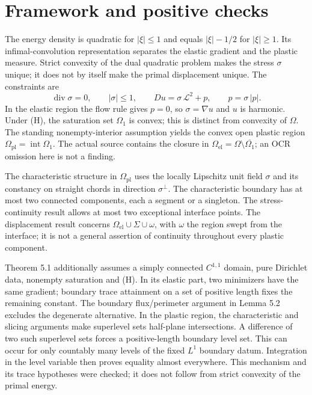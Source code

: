 \documentclass[10pt]{article}
\begin{document}
\section*{Framework and positive checks}
The energy density is quadratic for \(|\xi|\leq1\) and equals \(|\xi|-1/2\) for \(|\xi|\geq1\). Its infimal-convolution representation separates the elastic gradient and the plastic measure. Strict convexity of the dual quadratic problem makes the stress \(\sigma\) unique; it does not by itself make the primal displacement unique. The constraints are \[\operatorname{div}\sigma=0,\qquad |\sigma|\leq1,\qquad
 Du=\sigma\,\mathcal L^2+p,\qquad p=\sigma\,|p|.\] In the elastic region the flow rule gives \(p=0\), so \(\sigma=\nabla u\) and \(u\) is harmonic. Under (H), the saturation set \(\Omega_1\) is convex; this is distinct from convexity of \(\Omega\). The standing nonempty-interior assumption yields the convex open plastic region \(\Omega_{\mathrm{pl}}=\operatorname{int}\Omega_1\). The actual source contains the closure in \(\Omega_{\mathrm{el}}=\Omega\setminus\overline{\Omega_1}\); an OCR omission here is not a finding.\par
The characteristic structure in \(\Omega_{\mathrm{pl}}\) uses the locally Lipschitz unit field \(\sigma\) and its constancy on straight chords in direction \(\sigma^\perp\). The characteristic boundary has at most two connected components, each a segment or a singleton. The stress-continuity result allows at most two exceptional interface points. The displacement result concerns \(\Omega_{\mathrm{el}}\cup\Sigma\cup\omega\), with \(\omega\) the region swept from the interface; it is not a general assertion of continuity throughout every plastic component.\par
Theorem 5.1 additionally assumes a simply connected \(C^{1,1}\) domain, pure Dirichlet data, nonempty saturation and (H). In its elastic part, two minimizers have the same gradient; boundary trace attainment on a set of positive length fixes the remaining constant. The boundary flux/perimeter argument in Lemma 5.2 excludes the degenerate alternative. In the plastic region, the characteristic and slicing arguments make superlevel sets half-plane intersections. A difference of two such superlevel sets forces a positive-length boundary level set. This can occur for only countably many levels of the fixed \(L^1\) boundary datum. Integration in the level variable then proves equality almost everywhere. This mechanism and its trace hypotheses were checked; it does not follow from strict convexity of the primal energy.\par
\end{document}
